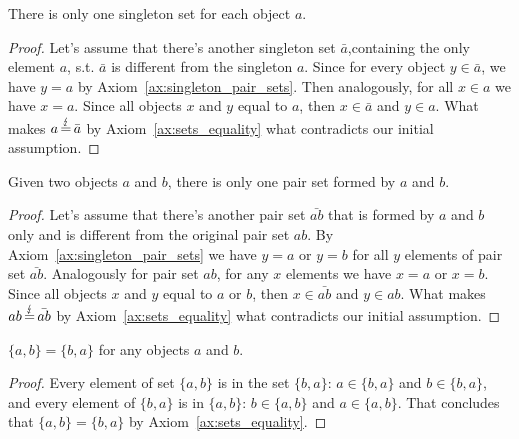 \begin{subsequence}
    
    \begin{proposition}
        \color{red}
        There is only one singleton set for each object $a$.
    \end{proposition}
    \begin{proof}
        Let's assume that there's another singleton set $\bar{a}$,containing the only element $a$, s.t. $\bar{a}$ is different from the singleton $a$. Since for every object $y \in \bar{a}$, we have $y=a$ by Axiom~\ref{ax:singleton_pair_sets}. Then analogously, for all $x\in a$ we have $x=a$. Since all objects $x$ and $y$ equal to $a$, then $x\in \bar{a}$ and $y \in a$. What makes $a\operatorname{\stackrel{\lightning}{=}}\bar{a}$ by Axiom~\ref{ax:sets_equality} what contradicts our initial assumption.
    \end{proof}
    
    \begin{proposition}
        \color{red}
        Given two objects $a$ and $b$, there is only one pair set formed by $a$ and $b$.
    \end{proposition}
    \begin{proof}
        Let's assume that there's another pair set $\bar{ab}$ that is formed by $a$ and $b$ only and is different from the original pair set $ab$. By Axiom~\ref{ax:singleton_pair_sets} we have $y=a$ or $y=b$ for all $y$ elements of pair set $\bar{ab}$. Analogously for pair set $ab$, for any $x$ elements we have $x=a$ or $x=b$. Since all objects $x$ and $y$ equal to $a$ or $b$, then $x\in \bar{ab}$ and $y \in ab$. What makes $ab\operatorname{\stackrel{\lightning}{=}}\bar{ab}$ by Axiom~\ref{ax:sets_equality} what contradicts our initial assumption.
    \end{proof}
    \begin{proposition}
        $\{a, b\}=\{b, a\}$ for any objects $a$ and $b$.
    \end{proposition}
    \begin{proof}
        Every element of set $\{a, b\}$ is in the set $\{b, a\}$: $a \in \{b, a\}$ and $b \in \{b, a\}$, and every element of $\{b, a\}$ is in $\{a, b\}$: $b \in \{a, b\}$ and $a \in \{a, b\}$. That concludes that $\{a, b\} = \{b, a\}$ by Axiom~\ref{ax:sets_equality}.
    \end{proof}
\end{subsequence}

